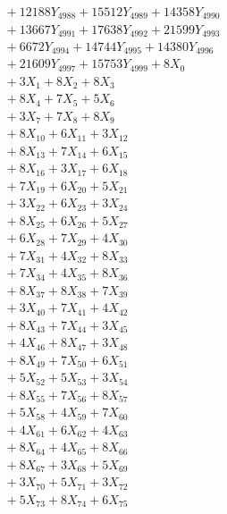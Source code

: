 \documentclass[a4paper,10pt]{article}
\begin{document}
{\begin{align}
&\;  + 12188 Y_{4988} + 15512 Y_{4989} + 14358 Y_{4990} \\[0.3ex]
&\;  + 13667 Y_{4991} + 17638 Y_{4992} + 21599 Y_{4993} \\[0.3ex]
&\;  + 6672 Y_{4994} + 14744 Y_{4995} + 14380 Y_{4996} \\[0.3ex]
&\;  + 21609 Y_{4997} + 15753 Y_{4999} + 8 X_{0} \\[0.3ex]
&\;  + 3 X_{1} + 8 X_{2} + 8 X_{3} \\[0.3ex]
&\;  + 8 X_{4} + 7 X_{5} + 5 X_{6} \\[0.3ex]
&\;  + 3 X_{7} + 7 X_{8} + 8 X_{9} \\[0.5ex]\allowbreak
&\;  + 8 X_{10} + 6 X_{11} + 3 X_{12} \\[0.3ex]
&\;  + 8 X_{13} + 7 X_{14} + 6 X_{15} \\[0.3ex]
&\;  + 8 X_{16} + 3 X_{17} + 6 X_{18} \\[0.3ex]
&\;  + 7 X_{19} + 6 X_{20} + 5 X_{21} \\[0.3ex]
&\;  + 3 X_{22} + 6 X_{23} + 3 X_{24} \\[0.3ex]
&\;  + 8 X_{25} + 6 X_{26} + 5 X_{27} \\[0.3ex]
&\;  + 6 X_{28} + 7 X_{29} + 4 X_{30} \\[0.3ex]
&\;  + 7 X_{31} + 4 X_{32} + 8 X_{33} \\[0.3ex]
&\;  + 7 X_{34} + 4 X_{35} + 8 X_{36} \\[0.3ex]
&\;  + 8 X_{37} + 8 X_{38} + 7 X_{39} \\[0.5ex]\allowbreak
&\;  + 3 X_{40} + 7 X_{41} + 4 X_{42} \\[0.3ex]
&\;  + 8 X_{43} + 7 X_{44} + 3 X_{45} \\[0.3ex]
&\;  + 4 X_{46} + 8 X_{47} + 3 X_{48} \\[0.3ex]
&\;  + 8 X_{49} + 7 X_{50} + 6 X_{51} \\[0.3ex]
&\;  + 5 X_{52} + 5 X_{53} + 3 X_{54} \\[0.3ex]
&\;  + 8 X_{55} + 7 X_{56} + 8 X_{57} \\[0.3ex]
&\;  + 5 X_{58} + 4 X_{59} + 7 X_{60} \\[0.3ex]
&\;  + 4 X_{61} + 6 X_{62} + 4 X_{63} \\[0.3ex]
&\;  + 8 X_{64} + 4 X_{65} + 8 X_{66} \\[0.3ex]
&\;  + 8 X_{67} + 3 X_{68} + 5 X_{69} \\[0.5ex]\allowbreak
&\;  + 3 X_{70} + 5 X_{71} + 3 X_{72} \\[0.3ex]
&\;  + 5 X_{73} + 8 X_{74} + 6 X_{75} \\[0.3ex]

\end{align}}
\end{document}
